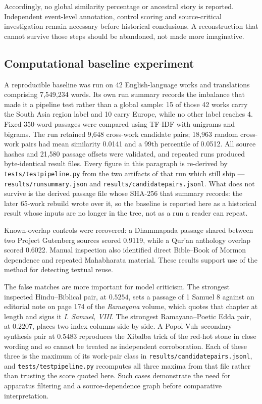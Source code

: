 \documentclass[11pt]{article}
\DeclareRobustCommand{\_}{\textunderscore\allowbreak}
\begin{document}
Accordingly, no global similarity percentage or ancestral story is reported.
Independent event-level annotation, control scoring and source-critical
investigation remain necessary before historical conclusions. A reconstruction
that cannot survive those steps should be abandoned, not made more imaginative.

\subsection{Computational baseline experiment}

A reproducible baseline was run on 42 English-language works and translations
comprising 7{,}549{,}234 words. Its own run summary records the imbalance that made it
a pipeline test rather than a global sample: 15 of those 42 works carry the South Asia
region label and 10 carry Europe, while no other label reaches 4.
Fixed 350-word passages were compared using
TF-IDF with unigrams and bigrams. The run retained 9{,}648 cross-work candidate
pairs; 18{,}963 random cross-work pairs had mean similarity 0.0141 and a 99th
percentile of 0.0512. All source hashes and 21{,}580 passage offsets were
validated, and repeated runs produced byte-identical result files.
Every figure in this paragraph is re-derived by \texttt{tests/test\_pipeline.py} from the
two artifacts of that run which still ship --- \texttt{results/run\_summary.json} and
\texttt{results/candidate\_pairs.jsonl}. What does not survive is the derived passage file
whose SHA-256 that summary records: the later 65-work rebuild wrote over it, so the
baseline is reported here as a historical result whose inputs are no longer in the tree,
not as a run a reader can repeat.

Known-overlap controls were recovered: a Dhammapada passage shared between two
Project Gutenberg sources scored 0.9119, while a Qur'an anthology overlap scored
0.6022. Manual inspection also identified direct Bible--Book of Mormon
dependence and repeated Mahabharata material. These results support use of the
method for detecting textual reuse.

The false matches are more important for model criticism. The strongest inspected
Hindu--Biblical pair, at \(0.5254\), sets a passage of 1 Samuel 8 against an
editorial note on page 174 of the \emph{Ramayana} volume, which quotes that chapter
at length and signs it \textit{I. Samuel, VIII}. The strongest Ramayana--Poetic Edda
pair, at \(0.2207\), places two index columns side by side. A Popol Vuh--secondary
synthesis pair at \(0.5483\) reproduces the Xibalba trick of the red-hot stone in
close wording and so cannot be treated as independent corroboration. Each of these
three is the maximum of its work-pair class in \texttt{results/candidate\_pairs.jsonl},
and \texttt{tests/test\_pipeline.py} recomputes all three maxima from that file rather
than trusting the score quoted here. Such cases demonstrate the need for
apparatus filtering and a source-dependence graph before comparative
interpretation.
\end{document}
